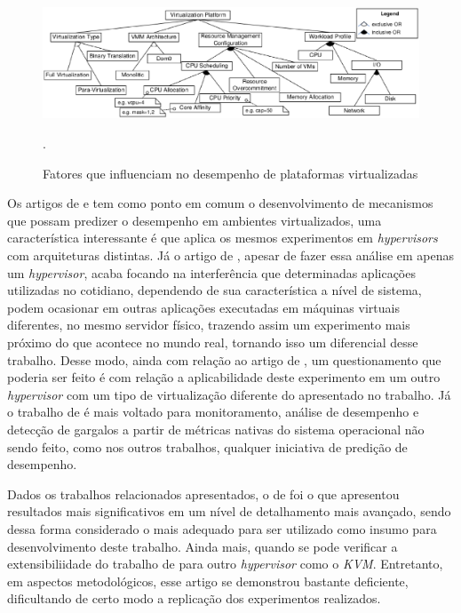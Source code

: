 \begin{figure}[!htb]
\centering
\includegraphics [keepaspectratio=true,scale=0.50]{figuras/factors_influence.eps}
\caption{Fatores que influenciam no desempenho de plataformas virtualizadas}
\cite{huber2011}.
\label{influence_factors}
\end{figure} 

Os artigos de  e  tem como ponto em comum o desenvolvimento de mecanismos que possam predizer o desempenho em ambientes virtualizados, uma característica interessante é que  aplica os mesmos experimentos em \textit{hypervisors} com arquiteturas distintas. Já o artigo de , apesar de fazer essa análise em apenas um \textit{hypervisor}, acaba focando na interferência que determinadas aplicações utilizadas no cotidiano, dependendo de sua característica a nível de sistema, podem ocasionar em outras aplicações executadas em máquinas virtuais diferentes, no mesmo servidor físico, trazendo assim um experimento mais próximo do que acontece no mundo real, tornando isso um diferencial desse trabalho. Desse modo, ainda com relação ao artigo de , um questionamento que poderia ser feito é com relação a aplicabilidade deste experimento em um outro \textit{hypervisor} com um tipo de virtualização diferente do apresentado no trabalho. Já o trabalho de  é mais voltado para monitoramento, análise de desempenho e detecção de gargalos a partir de métricas nativas do sistema operacional não sendo feito, como nos outros trabalhos, qualquer iniciativa de predição de desempenho.

Dados os trabalhos relacionados apresentados, o de  foi o que apresentou resultados mais significativos em um nível de detalhamento mais avançado, sendo dessa forma considerado o mais adequado para ser utilizado como insumo para desenvolvimento deste trabalho. Ainda mais, quando se pode verificar a extensibiliidade do trabalho de  para outro \textit{hypervisor} como o \textit{KVM}. Entretanto, em aspectos metodológicos, esse artigo se demonstrou bastante deficiente, dificultando de certo modo a replicação dos experimentos realizados. %

